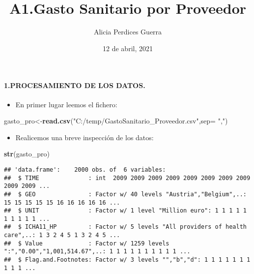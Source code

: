 \documentclass[]{article}
\title{A1.Gasto Sanitario por Proveedor}
\author{Alicia Perdices Guerra}
\date{12 de abril, 2021}
\newenvironment{Shaded}{\begin{snugshade}}{\end{snugshade}}
\newcommand{\DataTypeTok}[1]{\textcolor[rgb]{0.13,0.29,0.53}{#1}}
\newcommand{\KeywordTok}[1]{\textcolor[rgb]{0.13,0.29,0.53}{\textbf{#1}}}
\newcommand{\NormalTok}[1]{#1}
\newcommand{\StringTok}[1]{\textcolor[rgb]{0.31,0.60,0.02}{#1}}
\providecommand{\tightlist}{%
  \setlength{\itemsep}{0pt}\setlength{\parskip}{0pt}}
\let\oldparagraph\paragraph
\renewcommand{\paragraph}[1]{\oldparagraph{#1}\mbox{}}
\begin{document}
\maketitle

{
\setcounter{tocdepth}{2}
\tableofcontents
}
\hypertarget{procesamiento-de-los-datos.}{%
\paragraph{\texorpdfstring{\textbf{1.PROCESAMIENTO DE LOS
DATOS.}}{1.PROCESAMIENTO DE LOS DATOS.}}\label{procesamiento-de-los-datos.}}

\begin{itemize}
\tightlist
\item
  En primer lugar leemos el fichero:
\end{itemize}

\begin{Shaded}
\begin{Highlighting}[]
\NormalTok{gasto_pro<-}\KeywordTok{read.csv}\NormalTok{(}\StringTok{"C:/temp/GastoSanitario_Proveedor.csv"}\NormalTok{,}\DataTypeTok{sep=} \StringTok{","}\NormalTok{)}
\end{Highlighting}
\end{Shaded}

\begin{itemize}
\tightlist
\item
  Realicemos una breve inspección de los datos:
\end{itemize}

\begin{Shaded}
\begin{Highlighting}[]
\KeywordTok{str}\NormalTok{(gasto_pro)}
\end{Highlighting}
\end{Shaded}

\begin{verbatim}
## 'data.frame':    2000 obs. of  6 variables:
##  $ TIME              : int  2009 2009 2009 2009 2009 2009 2009 2009 2009 2009 ...
##  $ GEO               : Factor w/ 40 levels "Austria","Belgium",..: 15 15 15 15 15 16 16 16 16 16 ...
##  $ UNIT              : Factor w/ 1 level "Million euro": 1 1 1 1 1 1 1 1 1 1 ...
##  $ ICHA11_HP         : Factor w/ 5 levels "All providers of health care",..: 1 3 2 4 5 1 3 2 4 5 ...
##  $ Value             : Factor w/ 1259 levels ":","0.00","1,001,514.67",..: 1 1 1 1 1 1 1 1 1 1 ...
##  $ Flag.and.Footnotes: Factor w/ 3 levels "","b","d": 1 1 1 1 1 1 1 1 1 1 ...
\end{verbatim}
\end{document}
